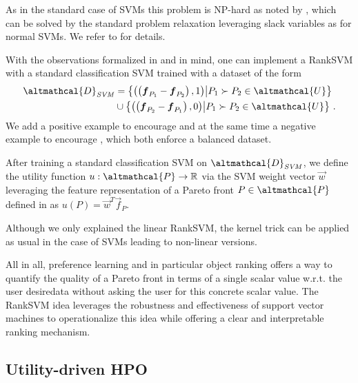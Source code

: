 As in the standard case of SVMs this problem is NP-hard as noted by \cite{joachims2002optimizing}, which can be solved by the standard problem relaxation leveraging slack variables as for normal SVMs. We refer to \cite{joachims2002optimizing} for details. 

With the observations formalized in  and  in mind, one can implement a RankSVM with a standard classification SVM trained with a dataset of the form 
\begin{equation}
\begin{split}
    \altmathcal{D}_{\mathit{SVM}} &= \left\{ \left(\left(\vec{f}_{P_{1}}-\vec{f}_{P_{2}}\right), 1\right) \middle\vert  P_{1} \succ P_{2} \in \altmathcal{U} \right\} \\
    &\cup \left\{ \left(\left(\vec{f}_{P_{2}}-\vec{f}_{P_{1}}\right), 0\right) \middle\vert  P_{1} \succ P_{2} \in \altmathcal{U} \right\} \, .
\end{split}
\end{equation}
We add a positive example to encourage  and at the same time a negative example to encourage , which both enforce a balanced dataset.

After training a standard classification SVM on $\altmathcal{D}_{\mathit{SVM}}$, we define the utility function $u: \altmathcal{P} \rightarrow \mathbb{R}$ via the SVM weight vector $\vec{w}$ leveraging the feature representation of a Pareto front $P \in \altmathcal{P}$ defined in  as $u(P) = \vec{w}^T\vec{f}_P$.

Although we only explained the linear RankSVM, the kernel trick \cite{scholkopf-book02} can be applied as usual in the case of SVMs leading to non-linear versions.



All in all, preference learning and in particular object ranking offers a way to quantify the quality of a Pareto front in terms of a single scalar value w.r.t. the user desiredata without asking the user for this concrete scalar value.
The RankSVM idea leverages the robustness and effectiveness of support vector machines to operationalize this idea while offering a clear and interpretable ranking mechanism. 

\subsection{Utility-driven HPO}
\label{moo-ssec:utility_automl}

